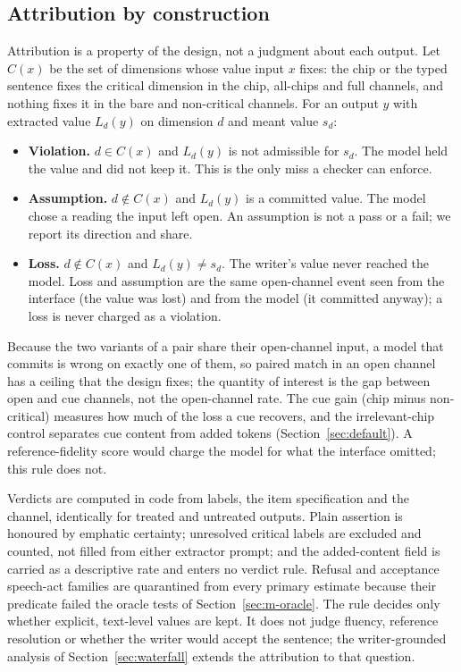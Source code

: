 \subsection{Attribution by construction}\label{sec:m-attr}

Attribution is a property of the design, not a judgment about each output.
Let $C(x)$ be the set of dimensions whose value input $x$ fixes: the chip or the typed sentence fixes the critical dimension in the chip, all-chips and full channels, and nothing fixes it in the bare and non-critical channels.
For an output $y$ with extracted value $L_d(y)$ on dimension $d$ and meant value $s_d$:
\begin{itemize}
\item \textbf{Violation.} $d\in C(x)$ and $L_d(y)$ is not admissible for $s_d$. The model held the value and did not keep it. This is the only miss a checker can enforce.
\item \textbf{Assumption.} $d\notin C(x)$ and $L_d(y)$ is a committed value. The model chose a reading the input left open. An assumption is not a pass or a fail; we report its direction and share.
\item \textbf{Loss.} $d\notin C(x)$ and $L_d(y)\neq s_d$. The writer's value never reached the model. Loss and assumption are the same open-channel event seen from the interface (the value was lost) and from the model (it committed anyway); a loss is never charged as a violation.
\end{itemize}
Because the two variants of a pair share their open-channel input, a model that commits is wrong on exactly one of them, so paired match in an open channel has a ceiling that the design fixes; the quantity of interest is the gap between open and cue channels, not the open-channel rate.
The cue gain (chip minus non-critical) measures how much of the loss a cue recovers, and the irrelevant-chip control separates cue content from added tokens (Section~\ref{sec:default}).
A reference-fidelity score would charge the model for what the interface omitted; this rule does not.

Verdicts are computed in code from labels, the item specification and the channel, identically for treated and untreated outputs.
Plain assertion is honoured by emphatic certainty; unresolved critical labels are excluded and counted, not filled from either extractor prompt; and the added-content field is carried as a descriptive rate and enters no verdict rule.
Refusal and acceptance speech-act families are quarantined from every primary estimate because their predicate failed the oracle tests of Section~\ref{sec:m-oracle}.
The rule decides only whether explicit, text-level values are kept.
It does not judge fluency, reference resolution or whether the writer would accept the sentence; the writer-grounded analysis of Section~\ref{sec:waterfall} extends the attribution to that question.

